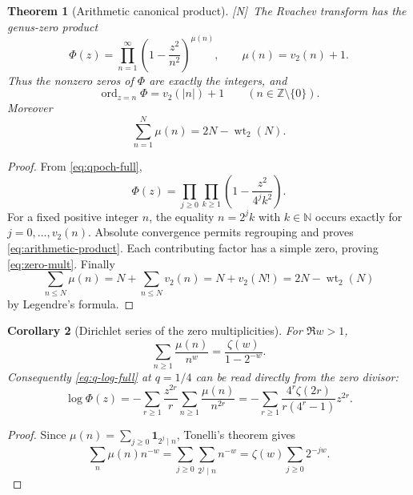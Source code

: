 \documentclass[11pt,oneside]{article}
\newtheorem{theorem}{Theorem}[section]
\newtheorem{corollary}[theorem]{Corollary}
\theoremstyle{definition}
\theoremstyle{remark}
\newcommand{\N}{\mathbb N}
\newcommand{\Z}{\mathbb Z}
\newcommand{\ord}{\operatorname{ord}}
\newcommand{\vtwo}{v_2}
\newcommand{\wt}{\operatorname{wt}_2}
\newcommand{\statusN}{\textsf{[N]}}
\begin{document}
\begin{theorem}[Arithmetic canonical product]\label{thm:arithmetic-product}
\statusN\ The Rvachev transform has the genus-zero product
\begin{equation}
 \boxed{
 \Phi(z)=\prod_{n=1}^{\infty}\left(1-\frac{z^2}{n^2}\right)^{\mu(n)},
 \qquad \mu(n)=\vtwo(n)+1.}                                \label{eq:arithmetic-product}
\end{equation}
Thus the nonzero zeros of $\Phi$ are exactly the integers, and
\begin{equation}
 \boxed{\ord_{z=n}\Phi=\vtwo(|n|)+1\qquad(n\in\Z\setminus\{0\}).} \label{eq:zero-mult}
\end{equation}
Moreover
\begin{equation}
 \sum_{n=1}^{N}\mu(n)=2N-\wt(N).                           \label{eq:zero-count}
\end{equation}
\end{theorem}

\begin{proof}
From \eqref{eq:qpoch-full},
\[
 \Phi(z)=\prod_{j\ge0}\prod_{k\ge1}
 \left(1-\frac{z^2}{4^jk^2}\right).
\]
For a fixed positive integer $n$, the equality $n=2^jk$ with $k\in\N$ occurs exactly for
$j=0,\ldots,\vtwo(n)$.  Absolute convergence permits regrouping and proves
\eqref{eq:arithmetic-product}.  Each contributing factor has a simple zero, proving
\eqref{eq:zero-mult}.  Finally
\[
 \sum_{n\le N}\mu(n)=N+\sum_{n\le N}\vtwo(n)
 =N+\vtwo(N!)=2N-\wt(N)
\]
by Legendre's formula.
\end{proof}

\begin{corollary}[Dirichlet series of the zero multiplicities]\label{cor:mu-Dirichlet}
For $\Re w>1$,
\begin{equation}
 \boxed{\sum_{n\ge1}\frac{\mu(n)}{n^w}
 =\frac{\zeta(w)}{1-2^{-w}}.}                              \label{eq:mu-Dirichlet}
\end{equation}
Consequently \eqref{eq:q-log-full} at $q=1/4$ can be read directly from the zero divisor:
\begin{equation}
 \log\Phi(z)=-\sum_{r\ge1}\frac{z^{2r}}r
 \sum_{n\ge1}\frac{\mu(n)}{n^{2r}}
 =-\sum_{r\ge1}\frac{4^r\zeta(2r)}{r(4^r-1)}z^{2r}.      \label{eq:logPhi-mu}
\end{equation}
\end{corollary}

\begin{proof}
Since $\mu(n)=\sum_{j\ge0}\mathbf1_{2^j\mid n}$, Tonelli's theorem gives
\[
 \sum_n\mu(n)n^{-w}=\sum_{j\ge0}\sum_{2^j\mid n}n^{-w}
 =\zeta(w)\sum_{j\ge0}2^{-jw}.
\]
\end{proof}
\end{document}
